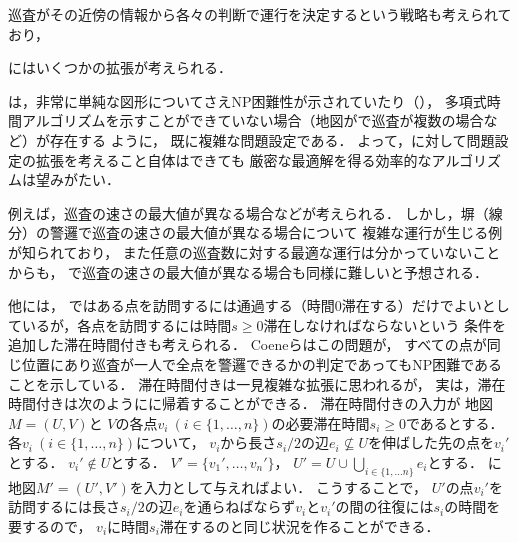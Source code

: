 巡査がその近傍の情報から各々の判断で運行を決定するという戦略も考えられており\cite{santana2004multi}，






{\patProb}にはいくつかの拡張が考えられる．

{\patProb}は，非常に単純な図形についてさえNP困難性が示されていたり（\cite[Theorems 5 and 6]{coene2011charlemagne}），
多項式時間アルゴリズムを示すことができていない場合（地図が{\graphLine}で巡査が複数の場合など）が存在する
ように，
既に複雑な問題設定である．
よって，{\patProb}に対して問題設定の拡張を考えること自体はできても
厳密な最適解を得る効率的なアルゴリズムは望みがたい．

例えば，巡査の速さの最大値が異なる場合などが考えられる．
しかし，塀（線分）の警邏で巡査の速さの最大値が異なる場合について
複雑な運行が生じる例が知られており\cite{kawamura2015fence}，
また任意の巡査数に対する最適な運行は分かっていないことからも，
{\patProb}で巡査の速さの最大値が異なる場合も同様に難しいと予想される．

\newcommand{\patProbWithDuration}{{滞在時間付き{\patProb}}}
他には，
{\patProb}ではある点を訪問するには通過する（時間$0$滞在する）だけでよいとしているが，各点を訪問するには時間$s \geq 0$滞在しなければならないという
条件を追加した{\patProbWithDuration}も考えられる．
Coeneら\cite{coene2011charlemagne}はこの問題が，
すべての点が同じ位置にあり巡査が一人で全点を警邏できるかの判定であってもNP困難であることを示している\cite[Theorem~3]{coene2011charlemagne}．
%
{\patProbWithDuration}は一見複雑な拡張に思われるが，
実は，{\patProbWithDuration}は次のように{\patProb}に帰着することができる．
{\patProbWithDuration}の入力が
地図$M = (U, V)$と
$V$の各点$v_i\ (i \in \{ 1, \ldots, n \})$の必要滞在時間$s_i \geq 0$であるとする．
各$v_i\ (i \in \{ 1, \ldots, n \})$について，
$v_i$から長さ$s_i/2$の辺$e_i \not\subseteq U$を伸ばした先の点を$v_i'$とする．
$v_i' \notin U$とする．
$V' = \{ v_1', \ldots, v_n' \}$，
$U' = U \cup \bigcup_{i \in \{ 1, \ldots n \}} e_i$とする．
{\patProb}に地図$M' = (U', V')$を入力として与えればよい．
%
こうすることで，
$U'$の点$v_i'$を訪問するには長さ$s_i/2$の辺$e_i$を通らねばならず$v_i$と$v_i'$の間の往復には$s_i$の時間を要するので，
$v_i$に時間$s_i$滞在するのと同じ状況を作ることができる．

